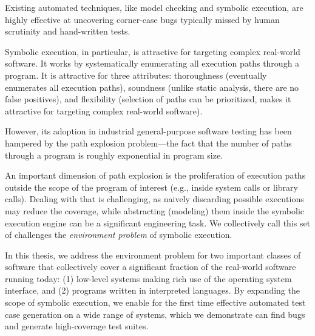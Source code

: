 

Existing automated techniques, like model checking and symbolic execution, are highly effective at uncovering corner-case bugs typically missed by human scrutinity and hand-written tests.

Symbolic execution, in particular, is attractive for targeting complex real-world software. It works by systematically enumerating all execution paths through a program.  It is attractive for three attributes: thoroughness (eventually enumerates all execution paths), soundness (unlike static analysis, there are no false positives), and flexibility (selection of paths can be prioritized, makes it attractive for targeting complex real-world software).

However, its adoption in industrial general-purpose software testing has been hampered by the path explosion problem---the fact that the number of paths through a program is roughly exponential in program size.

An important dimension of path explosion is the proliferation of execution paths outside the scope of the program of interest (e.g., inside system calls or library calls).  Dealing with that is challenging, as naively discarding possible executions may reduce the coverage, while abstracting (modeling) them inside the symbolic execution engine can be a significant engineering task.  We collectively call this set of challenges the \emph{environment problem} of symbolic execution.

In this thesis, we address the environment problem for two important classes of software that collectively cover a significant fraction of the real-world software running today: (1) low-level systems making rich use of the operating system interface, and (2) programs written in interpreted languages.  By expanding the scope of symbolic execution, we enable for the first time effective automated test case generation on a wide range of systems, which we demonstrate can find bugs and generate high-coverage test suites.

